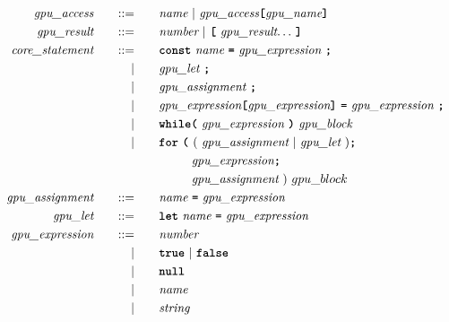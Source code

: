 \begin{alignat*}{9}
    && \textit{gpu\_access} 
    &&\quad ::= &\quad && \textit{name} \ | \
    \textit{gpu\_access} \textbf{\texttt{[}} \textit{gpu\_name} \textbf{\texttt{]}}\ \\
    && \textit{gpu\_result} 
    &&\quad ::= &\quad && \textit{number} \ | \
    \textbf{\texttt{[}}\ \textit{gpu\_result} {\ldots}\ \textbf{\texttt{]}}\ \\
    && \textit{core\_statement} 
    &&\quad ::= &\quad 
    && \textbf{\texttt{const}}\  \textit{name} \ 
        \textbf{\texttt{=}}\  \textit{gpu\_expression} \ \textbf{\texttt{;}} \\
    &&  && |    &\quad &&  \textit{gpu\_let} \ \textbf{\texttt{;}} \\
    &&  && |    &\quad &&  \textit{gpu\_assignment} \ \textbf{\texttt{;}} \\
    &&  && |    &\quad &&  \textit{gpu\_expression} \textbf{\texttt{[}} \textit{gpu\_expression} \textbf{\texttt{]}}\ \textbf{\texttt{=}}\  \textit{gpu\_expression} \ \textbf{\texttt{;}} \\
    &&  && |    &\quad &&  \textbf{\texttt{while}} \textbf{\texttt{(}}\  \textit{gpu\_expression} \ \textbf{\texttt{)}} \ \textit{gpu\_block} \\
    &&  && |    &\quad &&  \textbf{\texttt{for}}\ \textbf{\texttt{(}} 
                              \  ( \ \textit{gpu\_assignment} \ | \ \textit{gpu\_let} \ )\textbf{\texttt{;}} \\
    &&  &&     &\quad && \ \ \ \ \ \ \ \  \textit{gpu\_expression} \textbf{\texttt{;}} \\
    &&  &&     &\quad && \ \ \ \ \ \ \ \  \textit{gpu\_assignment} \ ) \ gpu\_block \\
    && \textit{gpu\_assignment} 
    &&\quad ::= &\quad 
    && \textit{name} \ \textbf{\texttt{=}}\  \textit{gpu\_expression} \\
    && \textit{gpu\_let} 
    &&\quad ::= &\quad 
    && \textbf{\texttt{let}} \ \textit{name} \ \textbf{\texttt{=}}\  \textit{gpu\_expression} \\
    && \textit{gpu\_expression} 
    &&\quad ::= &\quad 
    && \textit{number} \\
    &&  && |    &\quad &&  \textbf{\texttt{true}} \ | \ \textbf{\texttt{false}} \\
    &&  && |    &\quad &&  \textbf{\texttt{null}} \\
    &&  && |    &\quad &&  \textit{name}\\
    &&  && |    &\quad &&  \textit{string}\\

\end{alignat*}
